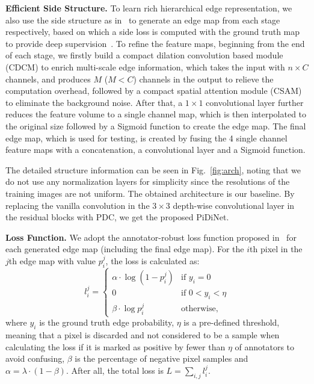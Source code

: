 \documentclass[10pt,twocolumn,letterpaper]{article}
\begin{document}
\vspace{0.3em}
\noindent \textbf{Efficient Side Structure.} \quad To learn rich hierarchical edge representation, we also use the side structure as in~\cite{xie2017holistically} to generate an edge map from each stage respectively, based on which a side loss is computed with the ground truth map to provide deep supervision~\cite{xie2017holistically}. To refine the feature maps, beginning from the end of each stage, we firstly build a compact dilation convolution based module (CDCM) to enrich multi-scale edge information, which takes the input with $n\times C$ channels, and produces $M$ ($M < C$) channels in the output to relieve the computation overhead, followed by a compact spatial attention module (CSAM) to eliminate the background noise. After that, a $1\times 1$ convolutional layer further reduces the feature volume to a single channel map, which is then interpolated to the original size followed by a Sigmoid function to create the edge map. The final edge map, which is used for testing, is created by fusing the 4 single channel feature maps with a concatenation, a convolutional layer and a Sigmoid function. 

The detailed structure information can be seen in Fig.~\ref{fig:arch}, noting that we do not use any normalization layers for simplicity since the resolutions of the training images are not uniform. The obtained architecture is our baseline. By replacing the vanilla convolution in the $3\times 3$ depth-wise convolutional layer in the residual blocks with PDC, we get the proposed PiDiNet.

\vspace{0.3em}
\noindent \textbf{Loss Function.} \quad We adopt the annotator-robust loss function proposed in~\cite{liu2019richer} for each generated edge map (including the final edge map). For the $i$th pixel in the $j$th edge map with value $p_i^j$, the loss is calculated as:
{\small \begin{equation}
    l_i^j = \begin{cases} 
    \alpha\cdot \log (1 - p_i^j) &\text{if } y_i  = 0 \\
    0 &\text{if } 0 < y_i < \eta \\
    \beta\cdot \log p_i^j &\text{otherwise},
    \end{cases}
\end{equation}}
where $y_i$ is the ground truth edge probability, $\eta$ is a pre-defined threshold, meaning that a pixel is discarded and not considered to be a sample when calculating the loss if it is marked as positive by fewer than $\eta$ of annotators to avoid confusing, $\beta$ is the percentage of negative pixel samples and $\alpha = \lambda\cdot (1-\beta)$. After all, the total loss is $L = \sum_{i,j}l_i^j$.
\end{document}
